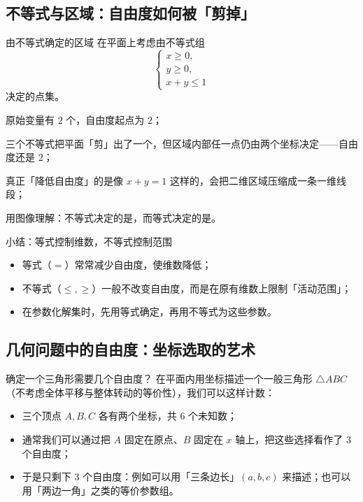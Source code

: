 \documentclass[a4paper,11pt]{ctexart}
\begin{document}
\subsection{不等式与区域：自由度如何被「剪掉」}

\begin{examplebox}{由不等式确定的区域}
  在平面上考虑由不等式组
  \[
    \begin{cases}
      x \ge 0,\\
      y \ge 0,\\
      x + y \le 1
    \end{cases}
  \]
  决定的点集。

  \begin{focuspoints}
    \item 原始变量有 $2$ 个，自由度起点为 $2$；
    \item 三个不等式把平面「剪」出了一个，但区域内部任一点仍由两个坐标决定——自由度还是 $2$；
    \item 真正「降低自由度」的是像 $x+y=1$ 这样的，会把二维区域压缩成一条一维线段；
    \item 用图像理解：不等式决定的是，而等式决定的是。
  \end{focuspoints}
\end{examplebox}

\begin{notebox}{小结：等式控制维数，不等式控制范围}
  \begin{itemize}
    \item 等式（$=$）常常减少自由度，使维数降低；
    \item 不等式（$\le,\ge$）一般不改变自由度，而是在原有维数上限制「活动范围」；
    \item 在参数化解集时，先用等式确定，再用不等式为这些参数。
  \end{itemize}
\end{notebox}

\subsection{几何问题中的自由度：坐标选取的艺术}

\begin{examplebox}{确定一个三角形需要几个自由度？}
  在平面内用坐标描述一个一般三角形 $\triangle ABC$（不考虑全体平移与整体转动的等价性），我们可以这样计数：
  \begin{itemize}
    \item 三个顶点 $A,B,C$ 各有两个坐标，共 $6$ 个未知数；
    \item 通常我们可以通过把 $A$ 固定在原点、$B$ 固定在 $x$ 轴上，把这些选择看作了 $3$ 个自由度；
    \item 于是只剩下 $3$ 个自由度：例如可以用「三条边长」$(a,b,c)$ 来描述；也可以用「两边一角」之类的等价参数组。
  \end{itemize}
\end{examplebox}
\end{document}
